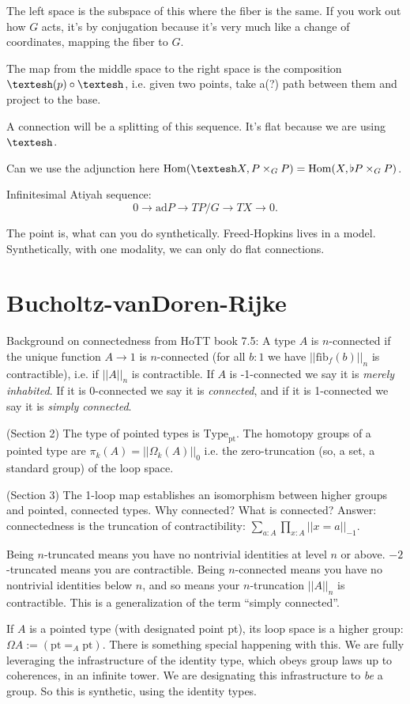 \documentclass[12pt]{article}
\newcommand{\Hom}{\mathrm{Hom}}
\newcommand{\shape}{\ensuremath{\text{\textesh}}}
\newcommand{\pt}{\mathrm{pt}}
\begin{document}
The left space is the subspace of this where the fiber is the same. If you work out how $G$ acts, it's by conjugation because it's very much like a change of coordinates, mapping the fiber to $G$.

The map from the middle space to the right space is the composition $\shape(p)\circ\shape$, i.e. given two points, take a(?) path between them and project to the base.

 A connection will be a splitting of this sequence. It's flat because we are using $\shape$.

Can we use the adjunction here $\Hom(\shape X, P\times_GP) = \Hom(X, \flat P\times_GP)$.

Infinitesimal Atiyah sequence: \[ 0 \to \mathrm{ad}P \to TP/G \to TX \to 0.\]

The point is, what can you do synthetically. Freed-Hopkins lives in a model. Synthetically, with one modality, we can only do flat connections.

\section{Bucholtz-vanDoren-Rijke}
Background on connectedness from HoTT book 7.5: A type $A$ is $n$-connected if the unique function $A\to 1$ is $n$-connected (for all $b : 1$ we have $||\mathrm{fib}_f(b)||_n$ is contractible), i.e. if $||A||_n$ is contractible. If $A$ is -1-connected we say it is \emph{merely inhabited}. If it is 0-connected we say it is \emph{connected}, and if it is 1-connected we say it is \emph{simply connected}.

(Section 2) The type of pointed types is $\mathrm{Type}_\mathrm{pt}$. The homotopy groups of a pointed type are $\pi_k(A) = ||{\Omega_k(A)}||_0$ i.e. the zero-truncation (so, a set, a standard group) of the loop space.

(Section 3) The 1-loop map establishes an isomorphism between higher groups and pointed, connected types. Why connected? What is connected? Answer: connectedness is the truncation of contractibility: $\sum_{a:A}\prod_{x:A}||x=a||_{-1}$.

Being $n$-truncated means you have no nontrivial identities at level $n$ or above. $-2$-truncated means you are contractible. Being $n$-connected means you have no nontrivial identities below $n$, and so means your $n$-truncation $||A||_n$ is contractible. This is a generalization of the term ``simply connected''.

If $A$ is a pointed type (with designated point pt), its loop space is a higher group: $\Omega A := (\pt =_A \pt)$. There is something special happening with this. We are fully leveraging the infrastructure of the identity type, which obeys group laws up to coherences, in an infinite tower. We are designating this infrastructure to \emph{be} a group. So this is synthetic, using the identity types.
\end{document}

